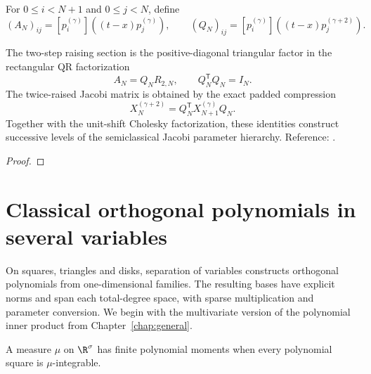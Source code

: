 \begin{definition}
\label{def:semiclassical-qr}
\leanok
For $0\le i<N+1$ and $0\le j<N$, define
\[
 (A_N)_{ij}=[p_i^{(\gamma)}]((t-x)p_j^{(\gamma)}),\qquad
 (Q_N)_{ij}=[p_i^{(\gamma)}]((t-x)p_j^{(\gamma+2)}).
\]
\end{definition}

\begin{theorem}
\label{thm:semiclassical-hierarchies}
\leanok
The two-step raising section is the positive-diagonal triangular factor in the
rectangular QR factorization
\[
 A_N=Q_NR_{2,N},\qquad Q_N^{\mathsf T}Q_N=I_N.
\]
The twice-raised Jacobi matrix is obtained by the exact padded compression
\[
 X^{(\gamma+2)}_N=Q_N^{\mathsf T}X^{(\gamma)}_{N+1}Q_N.
\]
Together with the unit-shift Cholesky factorization, these identities construct
successive levels of the semiclassical Jacobi parameter hierarchy.
Reference: \cite[Sections 3.1, 3.2 and 3.5]{pgso}.
\end{theorem}
\begin{proof}
\leanok
\end{proof}


\chapter{Classical orthogonal polynomials in several variables}\label{chap:multivariate}

On squares, triangles and disks, separation of variables constructs
orthogonal polynomials from one-dimensional families. The resulting bases
have explicit norms and span each total-degree space, with sparse
multiplication and parameter conversion. We begin with the multivariate
version of the polynomial inner product from Chapter~\ref{chap:general}.

\begin{definition}
\label{def:multivariate-moments}
\leanok
A measure $\mu$ on $\R^\sigma$ has finite polynomial moments when every
polynomial square is $\mu$-integrable.
\end{definition}

